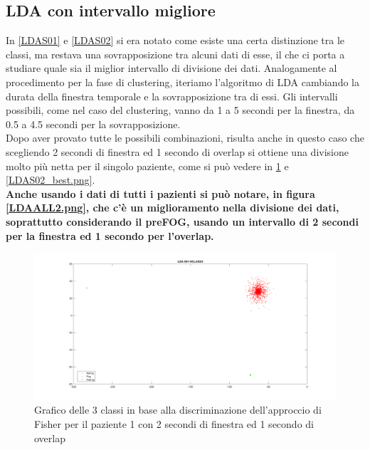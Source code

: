 \subsection{LDA con intervallo migliore}
In \ref{LDAS01} e \ref{LDAS02} si era notato come esiste una certa distinzione tra le classi, ma restava una sovrapposizione tra alcuni dati di esse, il che ci porta a studiare quale sia il miglior intervallo di divisione dei dati. Analogamente al procedimento per la fase di clustering, iteriamo l'algoritmo di LDA cambiando la durata della finestra temporale e la sovrapposizione tra di essi. Gli intervalli possibili, come nel caso del clustering, vanno da 1 a 5 secondi per la finestra, da 0.5 a 4.5 secondi per la sovrapposizione.\\
Dopo aver provato tutte le possibili combinazioni, risulta anche in questo caso che scegliendo 2 secondi di finestra ed 1 secondo di overlap si ottiene una divisione molto più netta per il singolo paziente, come si può vedere in \ref{LDAS01_best.png} e \ref{LDAS02_best.png}.\\
\textbf{Anche usando i dati di tutti i pazienti si può notare, in figura \ref{LDAALL2.png}, che c'è un miglioramento nella divisione dei dati, soprattutto considerando il preFOG, usando un intervallo di 2 secondi per la finestra ed 1 secondo per l'overlap.}
\begin{figure}[]
	\centering
	\includegraphics[width=1\textwidth]{images/LDAS01_best.png}
	\caption{Grafico delle 3 classi in base alla discriminazione dell'approccio di Fisher per il paziente 1 con 2 secondi di finestra ed 1 secondo di overlap}
	\label{LDAS01_best.png}
\end{figure}
